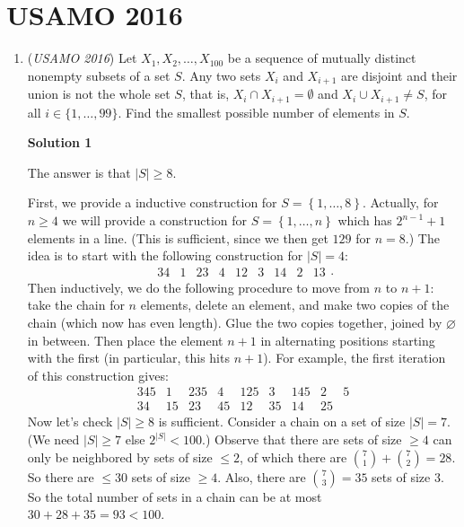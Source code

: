 \section{USAMO 2016}
        \begin{enumerate}
        	\item (\textit{USAMO 2016}) Let $X_1, X_2, \ldots, X_{100}$ be a sequence of mutually distinct nonempty subsets of a set $S$. Any two sets $X_i$ and $X_{i+1}$ are disjoint and their union is not the whole set $S$, that is, $X_i\cap X_{i+1}=\emptyset$ and $X_i\cup X_{i+1}\neq S$, for all $i\in\{1, \ldots, 99\}$. Find the smallest possible number of elements in $S$.


 



\textbf{Solution 1}

The answer is that $|S| \ge 8$.

 First, we provide a inductive construction for $S = \left\{ 1, \dots, 8 \right\}$. Actually, for $n \ge 4$ we will provide a construction for $S = \left\{ 1, \dots, n \right\}$ which has $2^{n-1} + 1$ elements in a line. (This is sufficient, since we then get $129$ for $n = 8$.) The idea is to start with the following construction for $|S| = 4$: 
 \[\begin{array}{ccccccccc} 34 & 1 & 23 & 4 & 12 & 3 & 14 & 2 & 13 \end{array}.\]Then inductively, we do the following procedure to move from $n$ to $n+1$: take the chain for $n$ elements, delete an element, and make two copies of the chain (which now has even length). Glue the two copies together, joined by $\varnothing$ in between. Then place the element $n+1$ in alternating positions starting with the first (in particular, this hits $n+1$). For example, the first iteration of this construction gives: 
 \[\begin{array}{ccccccccc} 345 & 1 & 235 & 4 & 125 & 3 & 145 & 2 & 5 \\ 34 & 15 & 23 & 45 & 12 & 35 & 14 & 25 & \end{array}\]Now let's check $|S| \ge 8$ is sufficient. Consider a chain on a set of size $|S| = 7$. (We need $|S| \ge 7$ else $2^{|S|} < 100$.) Observe that there are sets of size $\ge 4$ can only be neighbored by sets of size $\le 2$, of which there are $\binom 71 + \binom 72 = 28$. So there are $\le 30$ sets of size $\ge 4$. Also, there are $\binom 73 = 35$ sets of size $3$. So the total number of sets in a chain can be at most $30 + 28 + 35 = 93 < 100$.


\end{enumerate}
